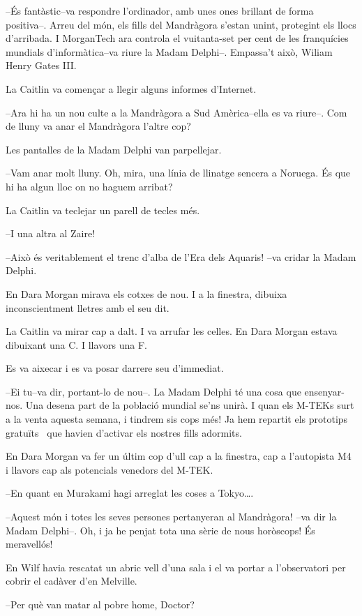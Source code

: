--És fantàstic--va respondre l'ordinador, amb unes ones brillant de
forma positiva--. Arreu del món, els fills del Mandràgora s'estan unint,
protegint els llocs d'arribada. I MorganTech ara controla el
vuitanta-set per cent de les franquícies mundials d'informàtica--va
riure la Madam Delphi--. Empassa't això, Wiliam Henry Gates III.

La Caitlin va començar a llegir alguns informes d'Internet.

--Ara hi ha un nou culte a la Mandràgora a Sud Amèrica--ella es va
riure--. Com de lluny va anar el Mandràgora l'altre cop?

Les pantalles de la Madam Delphi van parpellejar.

--Vam anar molt lluny. Oh, mira, una línia de llinatge sencera a
Noruega. És que hi ha algun lloc on no haguem arribat?

La Caitlin va teclejar un parell de tecles més.

--I una altra al Zaire!

--Això és veritablement el trenc d'alba de l'Era dels Aquaris! --va
cridar la Madam Delphi.

En Dara Morgan mirava els cotxes de nou. I a la finestra, dibuixa
inconscientment lletres amb el seu dit.

La Caitlin va mirar cap a dalt. I va arrufar les celles. En Dara Morgan
estava dibuixant una C. I llavors una F.

Es va aixecar i es va posar darrere seu d'immediat.

--Ei tu--va dir, portant-lo de nou--. La Madam Delphi té una cosa que
ensenyar-nos. Una desena part de la població mundial se'ns unirà. I quan
els M-TEKs surt a la venta aquesta semana, i tindrem sis cops més! Ja
hem repartit els prototips gratuïts ~que havien d'activar els nostres
fills adormits.

En Dara Morgan va fer un últim cop d'ull cap a la finestra, cap a
l'autopista M4 i llavors cap als potencials venedors del M-TEK.

--En quant en Murakami hagi arreglat les coses a Tokyo\ldots{}.

--Aquest món i totes les seves persones pertanyeran al Mandràgora! --va
dir la Madam Delphi--. Oh, i ja he penjat tota una sèrie de nous
horòscops! És meravellós!

En Wilf havia rescatat un abric vell d'una sala i el va portar a
l'observatori per cobrir el cadàver d'en Melville.

--Per què van matar al pobre home, Doctor?

